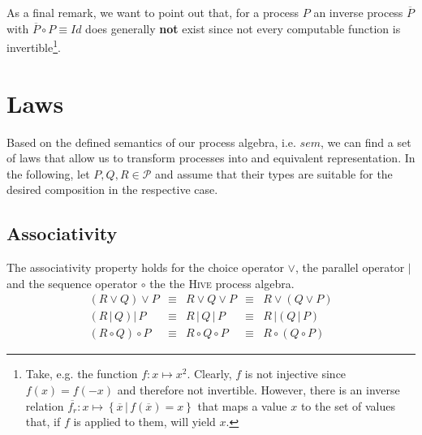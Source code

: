 As a final remark, we want to point out that, for a process $P$ an inverse process $\overline{P}$ with $\overline{P} \circ P \equiv Id$ does generally \textbf{not} exist since not every computable function is invertible\footnote{Take, e.g. the function $f \colon x \mapsto x^2$. Clearly, $f$ is not injective since $f \left( x \right) = f \left( -x \right)$ and therefore not invertible. However, there is an inverse relation $\overline{f_r} \colon x \mapsto \left\{ \overline{x} \,|\, f \left( \overline{x} \right) = x \right\}$ that maps a value $x$ to the set of values that, if $f$ is applied to them, will yield $x$.}.






\section{Laws}
\label{chp:laws}
Based on the defined semantics of our process algebra, i.e. $sem$, we can find a set of laws that allow us to transform processes into and equivalent representation. In the following, let $P, Q, R \in \mathcal{P}$ and assume that their types are suitable for the desired composition in the respective case.

\subsection{Associativity}
The associativity property holds for the choice operator $\vee$, the parallel operator $|$ and the sequence operator $\circ$ the the \textsc{Hive} process algebra.
\begin{equation*}
\begin{array}{rcccl}
  \left( R \vee Q \right) \vee P & \equiv & R \vee Q \vee P & \equiv & R \vee \left( Q \vee P \right) \\
  \left( R \,|\, Q \right) |\, P & \equiv & R \,|\, Q \,|\, P & \equiv & R \,| \left( Q \,|\, P \right) \\
  \left( R \circ Q \right) \circ P & \equiv & R \circ Q \circ P & \equiv & R \circ \left( Q \circ P \right)
\end{array}
\end{equation*}


